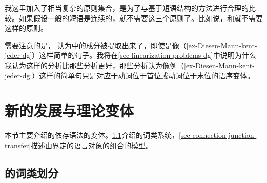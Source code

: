 我这里加入了相当复杂的原则集合，是为了与基于短语结构的方法进行合理的比较。如果假设一般的短语是连续的，就不需要这三个原则了。比如说，\lfgc 和\hpsgc 就不需要这样的原则。

需要注意的是， \citet[]{Hudson97a}认为\vfc 中的成分被提取出来了，即使是像（\ref{ex-Diesen-Mann-kent-jeder-dg}）这样简单的句子。我将在\ref{sec-linearization-problems-dg}中说明为什么我认为这样的分析比那些分析更好，那些分析认为像例（\ref{ex-Diesen-Mann-kent-jeder-dg}）这样的简单句只是对应于动词位于首位或动词位于末位的语序变体。

\section{新的发展与理论变体}

本节主要介绍\tes 的依存语法的变体。\ref{sec-tesniere-pos}介绍\tes 的词类系统，\ref{sec-connection-junction-transfer}描述由\tes 界定的语言对象的组合的模型。

\subsection{\tes 的词类划分}
\label{sec-tesniere-pos}

